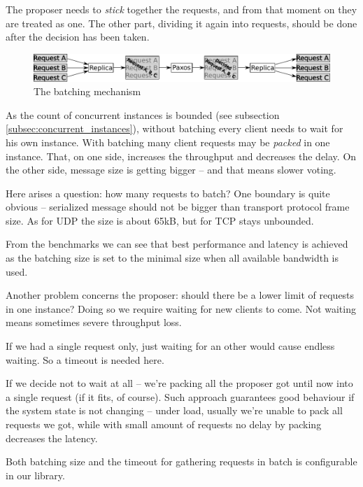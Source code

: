 The proposer needs to \textit{stick} together the requests, and from that moment on they are treated as one. The other part, dividing it again into requests, should be done after the decision has been taken.
\begin{figure}[h]
\includegraphics[keepaspectratio, width=\textwidth]{features/batching.pdf}
\vspace{-1em}
\caption{The batching mechanism}
\vspace{-1em}
\end{figure}

As the count of concurrent instances is bounded (see subsection \ref{subsec:concurrent_instances}), without batching every client needs to wait for his own instance. With batching many client requests may be \textit{packed} in one instance. That, on one side, increases the throughput and decreases the delay.
On the other side, message size is getting bigger -- and that means slower voting.

Here arises a question: how many requests to batch? One boundary is quite obvious -- serialized message should not be bigger than transport protocol frame size. As for UDP the size is about 65kB, but for TCP stays unbounded.

From the benchmarks %
we can see that best performance and latency is achieved as the batching size is set to the minimal size when all available bandwidth is used.

Another problem concerns the proposer: should there be a lower limit of requests in one instance? Doing so we require waiting for new clients to come. Not waiting means sometimes severe throughput loss.

If we had a single request only, just waiting for an other would cause endless waiting. So a timeout is needed here.

If we decide not to wait at all -- we're packing all the proposer got until now into a single request (if it fits, of course). Such approach guarantees good behaviour if the system state is not changing -- under load, usually we're unable to pack all requests we got, while with small amount of requests no delay by packing decreases the latency.

Both batching size and the timeout for gathering requests in batch is configurable in our library.


